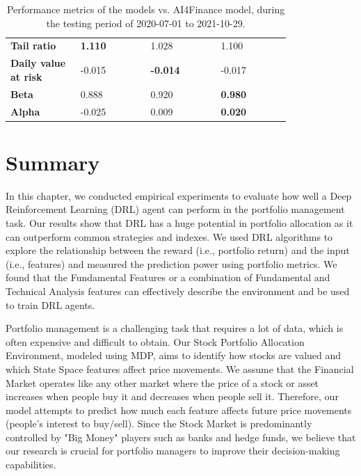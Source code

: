 \documentclass[../xlapes02]{subfiles}
\begin{document}
\begin{table}
{\begin{tabular}{*{4}{|m{0.20\linewidth}|}}
                \bfseries Tail ratio          & \color[HTML]{00F000} \bfseries 1.110 & 1.028                                 & 1.100 \\[0.5cm]
                \bfseries Daily value at risk & -0.015                               & \color[HTML]{00F000} \bfseries -0.014 & -0.017 \\[0.5cm]
                \bfseries Beta                & 0.888                                & 0.920                                 & \color[HTML]{00F000} \bfseries 0.980 \\[0.5cm]
                \bfseries Alpha               & -0.025                               & 0.009                                 & \color[HTML]{00F000} \bfseries 0.020 \\[0.5cm]
                \bottomrule
            \end{tabular}
        }
        \caption{Performance metrics of the models vs. AI4Finance model, during the testing period of 2020-07-01 to 2021-10-29.}
        \label{tab:stats2}
    \end{table}


    \section{Summary}\label{sec:summary}
    In this chapter, we conducted empirical experiments to evaluate how well a Deep Reinforcement Learning (DRL) agent can perform in the portfolio management task. Our results show that DRL has a huge potential in portfolio allocation as it can outperform common strategies and indexes. We used DRL algorithms to explore the relationship between the reward (i.e., portfolio return) and the input (i.e., features) and measured the prediction power using portfolio metrics. We found that the Fundamental Features or a combination of Fundamental and Technical Analysis features can effectively describe the environment and be used to train DRL agents.

    Portfolio management is a challenging task that requires a lot of data, which is often expensive and difficult to obtain. Our Stock Portfolio Allocation Environment, modeled using MDP, aims to identify how stocks are valued and which State Space features affect price movements. We assume that the Financial Market operates like any other market where the price of a stock or asset increases when people buy it and decreases when people sell it. Therefore, our model attempts to predict how much each feature affects future price movements (people's interest to buy/sell). Since the Stock Market is predominantly controlled by "Big Money" players such as banks and hedge funds, we believe that our research is crucial for portfolio managers to improve their decision-making capabilities.
\end{document}
